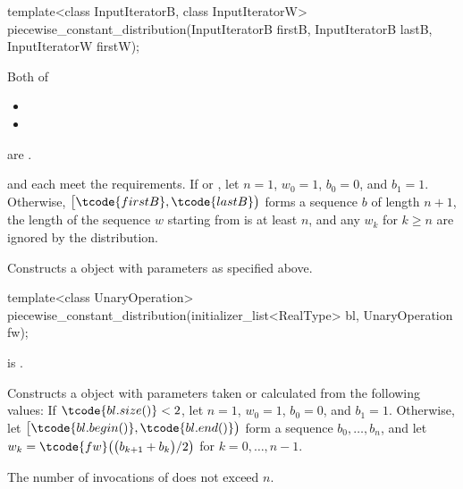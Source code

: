 %
\begin{itemdecl}
template<class InputIteratorB, class InputIteratorW>
 piecewise_constant_distribution(InputIteratorB firstB, InputIteratorB lastB,
                                 InputIteratorW firstW);
\end{itemdecl}

\begin{itemdescr}
\pnum
\mandates
Both of
\begin{itemize}
\item{}
\item{}
\end{itemize}
are .

\pnum
\expects
   and 
   each meet the
   requirements.
 If 
 or ,
 let $n = 1$,
     $w_0 = 1$,
     $b_0 = 0$,
 and $b_1 = 1$.
 Otherwise,
 $\bigl[\tcode{firstB}, \tcode{lastB}\bigr)$
 forms a sequence $b$ of length $n+1$,
 the length of the sequence $w$ starting from 
 is at least $n$,
 and any $w_k$ for  $k \geq n$ are ignored by the distribution.

\pnum
\effects
Constructs a  object
 with parameters as specified above.
\end{itemdescr}


%
\begin{itemdecl}
template<class UnaryOperation>
 piecewise_constant_distribution(initializer_list<RealType> bl, UnaryOperation fw);
\end{itemdecl}

\begin{itemdescr}
\pnum
\mandates
{} is .

\pnum
\effects
Constructs a  object
 with parameters taken or calculated
 from the following values:
 If $\tcode{bl.size()} < 2$,
 let $n = 1$,
     $w_0 = 1$,
     $b_0 = 0$,
 and $b_1 = 1$.
 Otherwise,
 let $\bigl[\tcode{bl.begin()}, \tcode{bl.end()}\bigr)$
 form a sequence $b_0, \dotsc, b_n$,
 and
 let $w_k = \tcode{fw}\bigl(\bigl(b_{k+1} + b_k\bigr) / 2\bigr)$
 for $k = 0, \dotsc, n - 1$.

\pnum
\complexity
The number of invocations of  does not exceed $n$.
\end{itemdescr}


